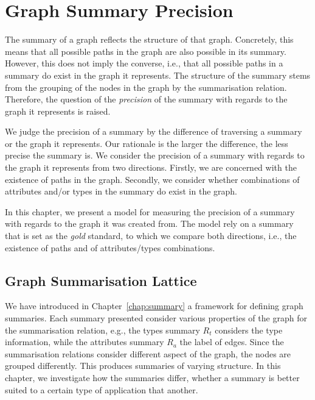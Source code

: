 \chapter{Graph Summary Precision}
\label{chap03:sec:quality}

The summary of a graph reflects the structure of that graph. Concretely, this means that all possible paths in the graph are also possible in its summary. However, this does not imply the converse, i.e., that all possible paths in a summary do exist in the graph it represents. The structure of the summary stems from the grouping of the nodes in the graph by the summarisation relation. Therefore, the question of the \emph{precision} of the summary with regards to the graph it represents is raised.

We judge the precision of a summary by the difference of traversing a summary or the graph it represents. Our rationale is the larger the difference, the less precise the summary is. We consider the precision of a summary with regards to the graph it represents from two directions. Firstly, we are concerned with the existence of paths in the graph. Secondly, we consider whether combinations of attributes and/or types in the summary do exist in the graph.

In this chapter, we present a model for measuring the precision of a summary with regards to the graph it was created from. The model rely on a summary that is set as the \emph{gold} standard, to which we compare both directions, i.e., the existence of paths and of attributes/types combinations.

\section{Graph Summarisation Lattice}

We have introduced in Chapter~\ref{chap:summary} a framework for defining graph summaries. Each summary presented consider various properties of the graph for the summarisation relation, e.g., the types summary $R_t$ considers the type information, while the attributes summary $R_a$ the label of edges. Since the summarisation relations consider different aspect of the graph, the nodes are grouped differently. This produces summaries of varying structure. In this chapter, we investigate how the summaries differ, whether a summary is better suited to a certain type of application that another.

